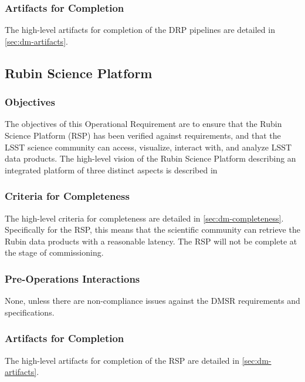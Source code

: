\subsubsection{Artifacts for Completion}
The high-level artifacts for completion of the DRP pipelines are detailed in \ref{sec:dm-artifacts}.

\subsection{Rubin Science Platform}

\subsubsection{Objectives}
The objectives of this Operational Requirement are to ensure that the Rubin Science Platform (RSP) has been verified against requirements, and that the LSST science community can access, visualize, interact with, and analyze LSST data products.
The high-level vision of the Rubin Science Platform describing an integrated platform of three distinct aspects is described in 

\subsubsection{Criteria for Completeness}
The high-level criteria for completeness are detailed in \ref{sec:dm-completeness}.
Specifically for the RSP, this means that the scientific community can retrieve the Rubin data products with a reasonable latency. The RSP will not be complete at the stage of commissioning.

\subsubsection{Pre-Operations Interactions}
None, unless there are non-compliance issues against the DMSR requirements and specifications.

\subsubsection{Artifacts for Completion}
The high-level artifacts for completion of the RSP are detailed in \ref{sec:dm-artifacts}.